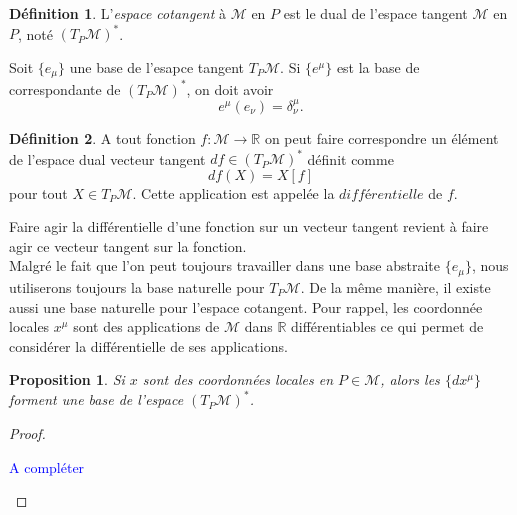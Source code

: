 \documentclass[a4paper,11pt]{report}
\theoremstyle{definition}
\theoremstyle{plain}
\newtheorem{prop}[thm]{Proposition}
\theoremstyle{definition}
\newtheorem{defn}{Définition}[chapter]
\theoremstyle{remark}
\newcommand{\comp}{\begin{center}\textcolor{blue}{A compléter}\end{center}}
\newcommand{\M}{\mathscr{M}}
\begin{document}
                \begin{defn}
                    L'\textit{espace cotangent} à $\M$ en $P$ est le dual de l'espace tangent $\M$ en $P$, noté $(T_P\M)^*$.
                \end{defn}
                
                Soit $\{e_\mu\}$ une base de l'esapce tangent $T_P\M$. Si $\{e^\mu\}$ est la base de correspondante de $(T_P\M)^*$, on doit avoir
                \begin{equation}
                    e^\mu(e_\nu) = \delta^\mu_\nu.
                \end{equation}
                
                \begin{defn}
                    A tout fonction $f:\M\to\mathbb{R}$ on peut faire correspondre un élément de l'espace dual vecteur tangent $df\in(T_P\M)^*$ définit comme
                    \begin{equation}
                        df(X) = X[f]
                    \end{equation}
                    pour tout $X\in T_P\M$. Cette application est appelée la $\textit{différentielle}$ de $f$.
                \end{defn}
                Faire agir la différentielle d'une fonction sur un vecteur tangent revient à faire agir ce vecteur tangent sur la fonction.\\
                
                Malgré le fait que l'on peut toujours travailler dans une base abstraite $\{e_\mu\}$, nous utiliserons toujours la base naturelle pour $T_P\M$. De la même manière, il existe aussi une base naturelle pour l'espace cotangent. Pour rappel, les coordonnée locales $x^\mu$ sont des applications de $\M$ dans $\mathbb{R}$ différentiables ce qui permet de considérer la différentielle de ses applications.
                
                \begin{prop}
                    Si $x$ sont des coordonnées locales en $P\in\M$, alors les $\{dx^\mu\}$ forment une base de l'espace $(T_P\M)^*$.
                \end{prop}
                
                \begin{proof}${}$\\
                    \comp
                \end{proof}
                
\end{document}

